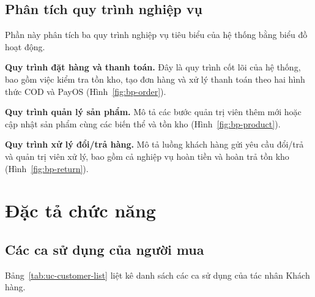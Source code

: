 
\subsection{Phân tích quy trình nghiệp vụ}

Phần này phân tích ba quy trình nghiệp vụ tiêu biểu của hệ thống bằng biểu đồ hoạt động.

\textbf{Quy trình đặt hàng và thanh toán.} Đây là quy trình cốt lõi của hệ thống, bao gồm việc
kiểm tra tồn kho, tạo đơn hàng và xử lý thanh toán theo hai hình thức COD và PayOS
(Hình~\ref{fig:bp-order}).


\textbf{Quy trình quản lý sản phẩm.} Mô tả các bước quản trị viên thêm mới hoặc cập nhật sản
phẩm cùng các biến thể và tồn kho (Hình~\ref{fig:bp-product}).


\textbf{Quy trình xử lý đổi/trả hàng.} Mô tả luồng khách hàng gửi yêu cầu đổi/trả và quản trị
viên xử lý, bao gồm cả nghiệp vụ hoàn tiền và hoàn trả tồn kho (Hình~\ref{fig:bp-return}).


\section{Đặc tả chức năng}

\subsection{Các ca sử dụng của người mua}

Bảng~\ref{tab:uc-customer-list} liệt kê danh sách các ca sử dụng của tác nhân Khách hàng.


